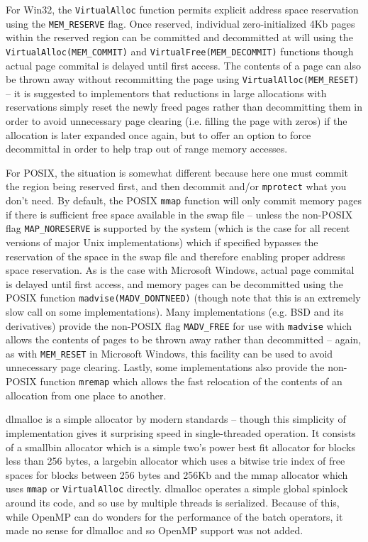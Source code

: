 \documentclass[wd]{isov2}
\begin{document}
{For Win32, the \texttt{VirtualAlloc} function permits explicit address space reservation using the \texttt{MEM\_RESERVE} flag. Once reserved, individual zero-initialized 4Kb pages within the reserved region can be committed and decommitted at will using the \texttt{VirtualAlloc(MEM\_COMMIT)} and \texttt{VirtualFree(MEM\_DECOMMIT)} functions though actual page commital is delayed until first access. The contents of a page can also be thrown away without recommitting the page using \texttt{VirtualAlloc(MEM\_RESET)} -- it is suggested to implementors that reductions in large allocations with reservations simply reset the newly freed pages rather than decommitting them in order to avoid unnecessary page clearing (i.e. filling the page with zeros) if the allocation is later expanded once again, but to offer an option to force decommittal in order to help trap out of range memory accesses.

For POSIX, the situation is somewhat different because here one must commit the region being reserved first, and then decommit and/or \texttt{mprotect} what you don't need. By default, the POSIX \texttt{mmap} function will only commit memory pages if there is sufficient free space available in the swap file -- unless the non-POSIX flag \texttt{MAP\_NORESERVE} is supported by the system (which is the case for all recent versions of major Unix implementations) which if specified bypasses the reservation of the space in the swap file and therefore enabling proper address space reservation. As is the case with Microsoft Windows, actual page commital is delayed until first access, and memory pages can be decommitted using the POSIX function \texttt{madvise(MADV\_DONTNEED)} (though note that this is an extremely slow call on some implementations). Many implementations (e.g. BSD and its derivatives) provide the non-POSIX flag \texttt{MADV\_FREE} for use with \texttt{madvise} which allows the contents of pages to be thrown away rather than decommitted -- again, as with \texttt{MEM\_RESET} in Microsoft Windows, this facility can be used to avoid unnecessary page clearing. Lastly, some implementations also provide the non-POSIX function \texttt{mremap} which allows the fast relocation of the contents of an allocation from one place to another.

dlmalloc is a simple allocator by modern standards -- though this simplicity of implementation gives it surprising speed in single-threaded operation. It consists of a smallbin allocator which is a simple two's power best fit allocator for blocks less than 256 bytes, a largebin allocator which uses a bitwise trie index of free spaces for blocks between 256 bytes and 256Kb and the mmap allocator which uses \texttt{mmap} or \texttt{VirtualAlloc} directly. dlmalloc operates a simple global spinlock around its code, and so use by multiple threads is serialized. Because of this, while OpenMP can do wonders for the performance of the batch operators, it made no sense for dlmalloc and so OpenMP support was not added.

}
\end{document}
